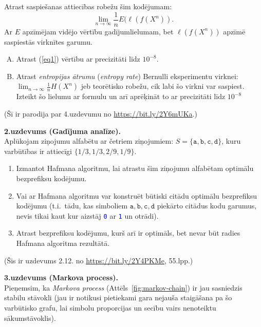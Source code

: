 \documentclass[a4paper]{article}
\begin{document}
Atrast saspiešanas attiecības robežu šim kodējumam:
\begin{equation}
\label{eq1}
\lim_{n \rightarrow \infty} \frac{1}{n} E(\ell(f(X^n)).
\end{equation}
Ar $E$ apzīmējam vidējo vērtību gadījumlielumam, bet
$\ell(f(X^n))$ apzīmē saspiestās virknītes garumu.

\begin{enumerate}[(A)]
\item
Atrast (\ref{eq1}) vērtību ar precizitāti līdz $10^{-8}$.
\item
Atrast {\em entropijas ātrumu} ({\em entropy rate}) Bernulli eksperimentu virknei:
$\lim_{n \rightarrow \infty} \frac{1}{n} H(X^n)$ jeb teo\-rē\-tis\-ko robežu, cik labi
šo virkni var saspiest. Izteikt šo lielumu ar formulu un arī aprēķināt to
ar precizitāti līdz $10^{-8}$
\end{enumerate}

(Šī ir parodija par 4.uzdevumu no \url{https://bit.ly/2Y6mUKa}.)


\vspace{10pt}
{\bf 2.uzdevums (Gadījuma analīze).}\\
Aplūkojam ziņojumu alfabētu ar četriem ziņojumiem:
$S = \{ \mathtt{a}, \mathtt{b}, \mathtt{c}, \mathtt{d} \}$,
kuru varbūtības ir attiecīgi $\{1/3, 1/3, 2/9, 1/9\}$.

\begin{enumerate}
\item Izmantot Hafmana algoritmu, lai atrastu šim ziņojumu alfabētam optimālu bezprefiksu ko\-dē\-ju\-mu.
\item Vai ar Hafmana algoritmu var konstruēt bū\-tis\-ki citādu optimālu bezprefiksu kodējumu
(t.i.\ tādu, kas simboliem $\mathtt{a}, \mathtt{b}, \mathtt{c}, \mathtt{d}$
piekārto citādus kodu garumus, nevis tikai kaut kur aizstāj
\textcolor{blue}{\tt 0} ar \textcolor{blue}{\tt 1} un otrādi).
\item Atrast bezprefiksu kodējumu, kurš arī ir optimāls, bet nevar būt radies Hafmana algoritma rezultātā.
\end{enumerate}

(Šis ir uzdevums 2.12. no \url{https://bit.ly/2Y4PKMe}, 55.lpp.)


\vspace{10pt}
{\bf 3.uzdevums (Markova process).}\\
Pieņemsim, ka {\em Markova process} (Attēls~\ref{fig:markov-chain})
ir jau sasniedzis stabilu stāvokli
(jau ir notikusi pietiekami gara nejauša staigāšana pa šo varbūtisko grafu, lai
simbolu proporcijas un secību vairs nenoteiktu sā\-kum\-stā\-vok\-lis).
\end{document}
